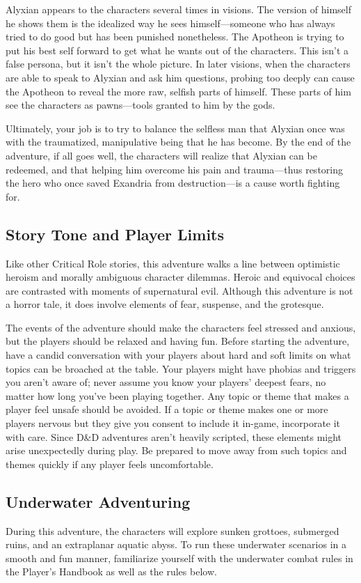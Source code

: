 \documentclass[10pt,a4paper,twoside,twocolumn,openany,nodeprecatedcode]{dndbook}
\begin{document}
Alyxian appears to the characters several times in visions. The version of himself he shows them is the idealized way he sees himself—someone who has always tried to do good but has been punished nonetheless. The Apotheon is trying to put his best self forward to get what he wants out of the characters. This isn't a false persona, but it isn't the whole picture. In later visions, when the characters are able to speak to Alyxian and ask him questions, probing too deeply can cause the Apotheon to reveal the more raw, selfish parts of himself. These parts of him see the characters as pawns—tools granted to him by the gods.

Ultimately, your job is to try to balance the selfless man that Alyxian once was with the traumatized, manipulative being that he has become. By the end of the adventure, if all goes well, the characters will realize that Alyxian can be redeemed, and that helping him overcome his pain and trauma—thus restoring the hero who once saved Exandria from destruction—is a cause worth fighting for.

\subsection{Story Tone and Player Limits}
Like other Critical Role stories, this adventure walks a line between optimistic heroism and morally ambiguous character dilemmas. Heroic and equivocal choices are contrasted with moments of supernatural evil. Although this adventure is not a horror tale, it does involve elements of fear, suspense, and the grotesque.

The events of the adventure should make the characters feel stressed and anxious, but the players should be relaxed and having fun. Before starting the adventure, have a candid conversation with your players about hard and soft limits on what topics can be broached at the table. Your players might have phobias and triggers you aren't aware of; never assume you know your players' deepest fears, no matter how long you've been playing together. Any topic or theme that makes a player feel unsafe should be avoided. If a topic or theme makes one or more players nervous but they give you consent to include it in-game, incorporate it with care. Since D\&D adventures aren't heavily scripted, these elements might arise unexpectedly during play. Be prepared to move away from such topics and themes quickly if any player feels uncomfortable.

\subsection{Underwater Adventuring}
During this adventure, the characters will explore sunken grottoes, submerged ruins, and an extraplanar aquatic abyss. To run these underwater scenarios in a smooth and fun manner, familiarize yourself with the underwater combat rules in the Player's Handbook as well as the rules below.
\end{document}
